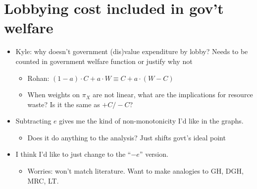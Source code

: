 \documentclass[12pt]{article}
\begin{document}
\section{Lobbying cost included in gov't welfare}
	\begin{itemize}
		\item Kyle: why doesn't government (dis)value expenditure by lobby? Needs to be counted in government welfare function or justify why not
			\begin{itemize}
				\item Rohan: $(1-a)\cdot C + a \cdot W \equiv C + a \cdot (W-C)$
				\item When weights on $\pi_X$ are not linear, what are the implications for resource waste? Is it the same as $+ C / - C$?
			\end{itemize}
		\item Subtracting $e$ gives me the kind of non-monotonicity I'd like in the graphs.
			\begin{itemize}
				\item Does it do anything to the analysis? Just shifts govt's ideal point
			\end{itemize}
		\item I think I'd like to just change to the ``$-e$'' version.
			\begin{itemize}
				\item Worries: won't match literature. Want to make analogies to GH, DGH, MRC, LT.
			\end{itemize}
	\end{itemize}
\end{document}
